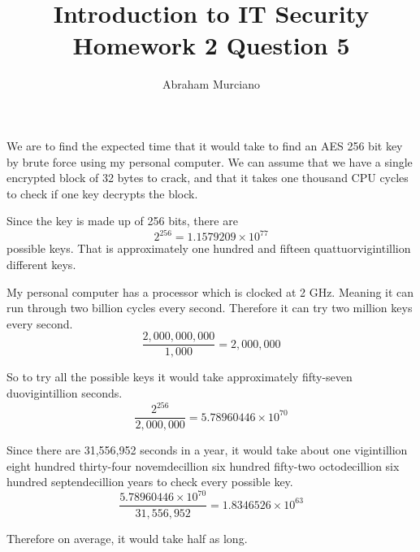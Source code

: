 \documentclass{article}
\title{Introduction to IT Security\\
\medskip
\large Homework 2 Question 5}
\author{Abraham Murciano}
\begin{document}
\maketitle

We are to find the expected time that it would take to find an AES 256 bit key by brute force using my personal computer. We can assume that we have a single encrypted block of 32 bytes to crack, and that it takes one thousand CPU cycles to check if one key decrypts the block.

Since the key is made up of 256 bits, there are
\[2^{256} = 1.1579209 \times 10^{77}\]
possible keys. That is approximately one hundred and fifteen quattuorvigintillion different keys.

My personal computer has a processor which is clocked at 2 GHz. Meaning it can run through two billion cycles every second. Therefore it can try two million keys every second.
\[\frac{2,000,000,000}{1,000} = 2,000,000\]

So to try all the possible keys it would take approximately fifty-seven duovigintillion seconds.
\[\frac{2^{256}}{2,000,000} = 5.78960446 \times 10^{70}\]

Since there are 31,556,952 seconds in a year, it would take about one vigintillion eight hundred thirty-four novemdecillion six hundred fifty-two octodecillion six hundred septendecillion years to check every possible key.
\[\frac{5.78960446 \times 10^{70}}{31,556,952} = 1.8346526 \times 10^{63}\]

Therefore on average, it would take half as long.
\end{document}
